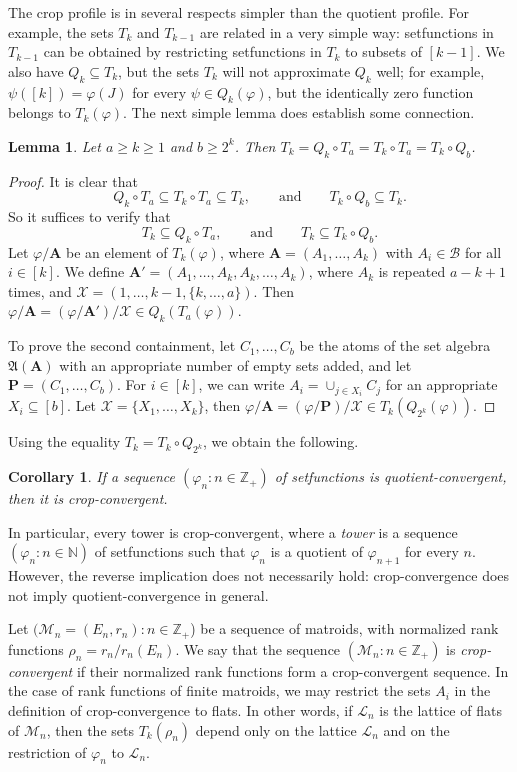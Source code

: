 \documentclass[10pt]{article}
\theoremstyle{plain}
\newtheorem{lem}[thm]{Lemma}
\newtheorem{cor}[thm]{Corollary}
\theoremstyle{definition}
\newcommand{\bP}{\mathbf{P}}
\newcommand{\bA}{\mathbf{A}}
\newcommand{\bbZ}{\mathbb{Z}}
\newcommand{\bbN}{\mathbb{N}}
\newcommand{\cB}{\mathcal{B}}
\newcommand{\LL}{\mathcal{L}}
\newcommand{\MM}{\mathcal{M}}
\newcommand{\cX}{\mathcal{X}}
\newcommand{\Af}{\mathfrak{A}}
\newcommand{\fg}{\varphi}
\begin{document}
The crop profile is in several respects simpler than the quotient profile. For
example, the sets $T_k$ and $T_{k-1}$ are related in a very simple way:
setfunctions in $T_{k-1}$ can be obtained by restricting setfunctions in $T_k$
to subsets of $[k-1]$. We also have $Q_k\subseteq T_k$, but the sets $T_k$ will not approximate $Q_k$ well; for example, $\psi([k])=\fg(J)$ for every $\psi\in Q_k(\fg)$, but the identically zero function belongs to $T_k(\fg)$. The next simple lemma does establish some connection.

\begin{lem}\label{LEM:SK-SK-QK}
Let $a\ge k\ge 1$ and $b\ge 2^k$. Then $T_k=Q_k\circ T_a=T_k\circ T_a=T_k\circ
Q_b$.
\end{lem}

\begin{proof}
It is clear that
\[
Q_k\circ T_a \subseteq T_k\circ T_a \subseteq T_k, \qquad\text{and}\qquad  T_k\circ Q_b \subseteq T_k.
\]
So it suffices to verify that
\[
T_k\subseteq Q_k\circ T_a, \qquad\text{and}\qquad  T_k\subseteq T_k\circ Q_b.
\]
Let $\fg/\bA$ be an element of $T_k(\fg)$, where $\bA=(A_1,\dots,A_k)$ with
$A_i\in\cB$ for all $i\in[k]$. We define $\bA'=(A_1,\dots,A_k,A_k,\dots,A_k)$, where $A_k$ is repeated
$a-k+1$ times, and $\cX =(1,\dots,k-1,\{k,\dots,a\})$. Then $\fg/\bA =
(\fg/\bA')/\cX  \in Q_k(T_a(\fg))$.

To prove the second containment, let $C_1,\dots,C_b$ be the atoms of the set
algebra $\Af(\bA)$ with an appropriate number of empty sets added, and let
$\bP=(C_1,\dots,C_b)$. For $i\in[k]$, we can write $A_i=\cup_{j\in X_i} C_j$
for an appropriate $X_i\subseteq [b]$. Let $\cX =\{X_1,\dots,X_k\}$, then
$\fg/\bA=(\fg/\bP)/\cX \in T_k(Q_{2^k}(\fg))$.
\end{proof}

Using the equality $T_k =T_k\circ Q_{2^k}$, we obtain the following.

\begin{cor}\label{COR:QK2SK}
If a sequence $(\fg_n\colon n\in\bbZ_+)$ of setfunctions is quotient-convergent,
then it is crop-convergent. 
\end{cor}

In particular, every tower is crop-convergent, where a {\it tower} is a sequence $(\fg_n\colon n\in\bbN)$ of setfunctions such that $\fg_n$ is a quotient of $\fg_{n+1}$ for every $n$. However, the reverse implication does not necessarily hold: crop-convergence does not imply quotient-convergence in general. 

Let $(\MM_n=(E_n,r_n)\colon n\in\bbZ_+$) be a
sequence of matroids, with normalized rank functions $\rho_n=r_n/r_n(E_n)$. We
say that the sequence $(\MM_n\colon n\in\bbZ_+)$ is {\it crop-convergent} if their
normalized rank functions form a crop-convergent sequence. In the case of rank functions of finite matroids, we may restrict the sets $A_i$ in the definition of crop-convergence to flats. In other words, if $\LL_n$
is the lattice of flats of $\MM_n$, then the sets $T_k(\rho_n)$ depend only on the
lattice $\LL_n$ and on the restriction of $\fg_n$ to $\LL_n$.
\end{document}
